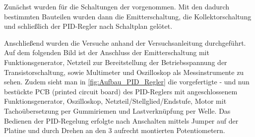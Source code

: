 Zunächst wurden für die Schaltungen der  vorgenommen. Mit den dadurch bestimmten Bauteilen wurden dann die Emitterschaltung, die Kollektorschaltung und schließlich der PID-Regler nach Schaltplan \cite[in][6,8,12]{Skript_01} gelötet.

Anschließend wurden die Versuche anhand der Versuchsanleitung\autocite{Skript_01} durchgeführt. Auf dem folgenden Bild ist der Anschluss der Emitterschaltung mit Funktionsgenerator, Netzteil zur Bereitstellung der Betriebsspannung der Transistorschaltung, sowie Multimeter und Oszilloskop als Messinstrumente zu sehen.
\clearpage
Zudem sieht man in \cref{fig:Aufbau_PID_Regler} die vorgefertigte - und nun bestückte PCB (printed circuit board) des PID-Reglers mit angeschlossenem Funktionsgenerator, Oszilloskop, Netzteil/Stellglied/Endstufe, Motor mit Tachoübersetzung per Gummiriemen und Lastverknüpfung per Welle. Das Bedienen der PID-Regelung erfolgte nach Anschalten mittels Jumper auf der Platine und durch Drehen an den 3 aufrecht montierten Potentiometern.

\FloatBarrier




